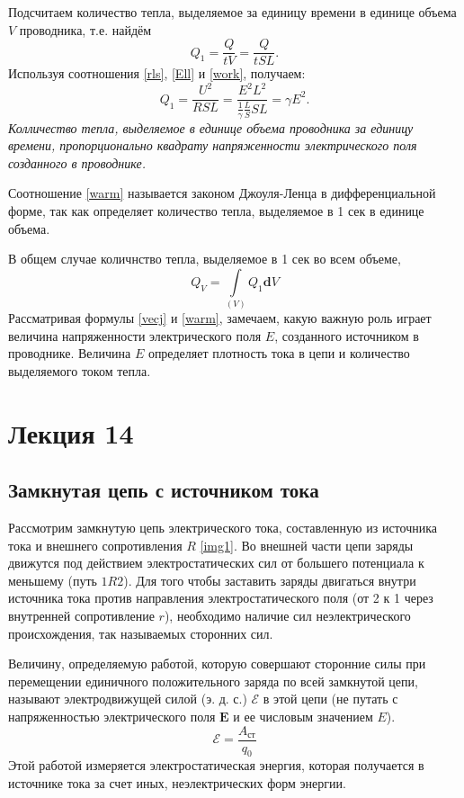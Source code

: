 \documentclass[a4paper,10pt]{book}
\begin{document}
Подсчитаем количество тепла, выделяемое за единицу времени в единице объема $V$ проводника, т.е. найдём 
\begin{equation}
 Q_1 = \frac{Q}{tV} = \frac{Q}{tSL}. \nonumber
\end{equation}
Используя соотношения \ref{rls}, \ref{Ell} и \ref{work}, получаем:
\begin{equation}\label{warm}
 Q_1 = \frac{U^2}{RSL} = \frac{E^2L^2}{\frac{1}{\gamma}\frac{L}{S}SL} = \gamma E^2.
\end{equation}
\emph{Колличество тепла, выделяемое в единице объема проводника за единицу времени, пропорционально квадрату напряженности электрического 
поля созданного в проводнике.}

Соотношение \ref{warm} называется законом Джоуля-Ленца в дифференциальной форме, так как определяет количество тепла, выделяемое в 1 сек
в единице объема.

В общем случае количнство тепла, выделяемое в 1 сек во всем объеме,
\begin{equation}\label{warmVol}
 Q_V = \int\limits_{(V)}Q_1\mathbf{d}V
\end{equation}
Рассматривая формулы \ref{vecj} и \ref{warm}, замечаем, какую важную роль играет величина напряженности электрического поля $E$, созданного
источником в проводнике. Величина $E$ определяет плотность тока в цепи и количество выделяемого током тепла.
\chapter{Лекция 14}
\section*{Замкнутая цепь с источником тока}
Рассмотрим замкнутую цепь электрического тока, составленную из источника тока и внешнего сопротивления $R$ \ref{img1}. Во внешней части цепи
заряды движутся под действием электростатических сил от большего потенциала к меньшему (путь $1R2$). Для того чтобы заставить заряды
двигаться внутри источника тока против направления электростатического поля (от 2 к 1 через внутренней сопротивление $r$), необходимо наличие
сил неэлектрического происхождения, так называемых сторонних сил.

Величину, определяемую работой, которую совершают сторонние силы при перемещении единичного положительного заряда по всей замкнутой цепи,
называют электродвижущей силой (э. д. с.) $\mathcal{E}$ в этой цепи (не путать с напряженностью электрического поля $\mathbf{E}$ и ее 
числовым значением $E$).
\begin{equation}\label{eds}
 \mathcal{E} = \frac{A_\text{ст}}{q_0}
\end{equation}
Этой работой измеряется электростатическая энергия, которая получается в источнике тока за счет иных, неэлектрических форм энергии.
\end{document}
